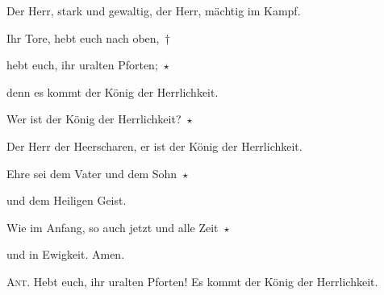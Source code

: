 Der Herr, stark und gewaltig, der Herr, mächtig im Kampf.

\noindent Ihr Tore, hebt euch nach oben,~†~\nopagebreak

hebt euch, ihr uralten Pforten;~$\star$~\nopagebreak

denn es kommt der König der Herrlichkeit.

\noindent Wer ist der König der Herrlichkeit?~$\star$~\nopagebreak

Der Herr der Heerscharen, er ist der König der Herrlichkeit.

\noindent Ehre sei dem Vater und dem Sohn~$\star$~\nopagebreak

und dem Heiligen Geist.

\noindent Wie im Anfang, so auch jetzt und alle Zeit~$\star$~\nopagebreak

und in Ewigkeit. Amen.

\vspace{10pt}

\noindent \textsc{Ant.} Hebt euch, ihr uralten Pforten! Es kommt der König der Herrlichkeit.
